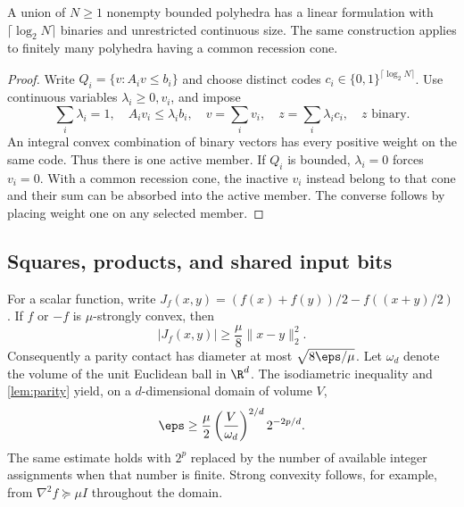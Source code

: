 \begin{lemma}\label{lem:disjunction}
A union of $N\ge1$ nonempty bounded polyhedra has a linear formulation
with $\lceil\log_2N\rceil$ binaries and unrestricted continuous size.
The same construction applies to finitely many polyhedra having a common
recession cone.
\end{lemma}
\begin{proof}
Write $Q_i=\{v:A_iv\le b_i\}$ and choose distinct codes
$c_i\in\{0,1\}^{\lceil\log_2N\rceil}$. Use continuous variables
$\lambda_i\ge0,v_i$, and impose
\[
 \sum_i\lambda_i=1,\quad A_iv_i\le\lambda_i b_i,\quad
 v=\sum_i v_i,\quad z=\sum_i\lambda_i c_i,\quad z\text{ binary}.
\]
An integral convex combination of binary vectors has every positive
weight on the same code. Thus there is one active member. If $Q_i$ is
bounded, $\lambda_i=0$ forces $v_i=0$. With a common recession cone,
the inactive $v_i$ instead belong to that cone and their sum can be
absorbed into the active member. The converse follows by placing weight
one on any selected member.
\end{proof}

\subsection{Squares, products, and shared input bits}

For a scalar function, write
$J_f(x,y)=(f(x)+f(y))/2-f((x+y)/2)$. If $f$ or $-f$ is
$\mu$-strongly convex, then
\begin{equation}\label{eq:strong-midpoint}
 |J_f(x,y)|\ge\frac\mu8\|x-y\|_2^2.
\end{equation}
Consequently a parity contact has diameter at most
$\sqrt{8\eps/\mu}$. Let $\omega_d$ denote the volume of the unit
Euclidean ball in $\R^d$. The isodiametric inequality and
\cref{lem:parity} yield, on a $d$-dimensional domain of volume $V$,
\begin{equation}\label{eq:strong-lower}
 \eps\ge\frac\mu2\left(\frac{V}{\omega_d}\right)^{2/d}2^{-2p/d}.
\end{equation}
The same estimate holds with $2^p$ replaced by the number of available
integer assignments when that number is finite. Strong convexity follows,
for example, from $\nabla^2f\succeq\mu I$ throughout the domain.

